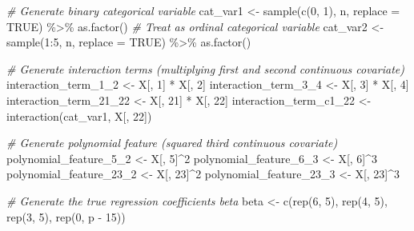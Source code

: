 \documentclass[
  11pt,
]{article}
\newenvironment{Shaded}{}{}
\newcommand{\AttributeTok}[1]{\textcolor[rgb]{0.49,0.56,0.16}{#1}}
\newcommand{\CommentTok}[1]{\textcolor[rgb]{0.38,0.63,0.69}{\textit{#1}}}
\newcommand{\ConstantTok}[1]{\textcolor[rgb]{0.53,0.00,0.00}{#1}}
\newcommand{\DecValTok}[1]{\textcolor[rgb]{0.25,0.63,0.44}{#1}}
\newcommand{\FunctionTok}[1]{\textcolor[rgb]{0.02,0.16,0.49}{#1}}
\newcommand{\NormalTok}[1]{#1}
\newcommand{\OtherTok}[1]{\textcolor[rgb]{0.00,0.44,0.13}{#1}}
\newcommand{\SpecialCharTok}[1]{\textcolor[rgb]{0.25,0.44,0.63}{#1}}
\begin{document}
\begin{Shaded}
\begin{Highlighting}[]
  \CommentTok{\# Generate binary categorical variable}
\NormalTok{  cat\_var1 }\OtherTok{\textless{}{-}} \FunctionTok{sample}\NormalTok{(}\FunctionTok{c}\NormalTok{(}\DecValTok{0}\NormalTok{, }\DecValTok{1}\NormalTok{), n, }\AttributeTok{replace =} \ConstantTok{TRUE}\NormalTok{) }\SpecialCharTok{\%\textgreater{}\%} 
    \FunctionTok{as.factor}\NormalTok{()}
  \CommentTok{\# Treat as ordinal categorical variable}
\NormalTok{  cat\_var2 }\OtherTok{\textless{}{-}} \FunctionTok{sample}\NormalTok{(}\DecValTok{1}\SpecialCharTok{:}\DecValTok{5}\NormalTok{, n, }\AttributeTok{replace =} \ConstantTok{TRUE}\NormalTok{) }\SpecialCharTok{\%\textgreater{}\%} 
    \FunctionTok{as.factor}\NormalTok{()}
  
  \CommentTok{\# Generate interaction terms (multiplying first and second continuous covariate)}
\NormalTok{  interaction\_term\_1\_2 }\OtherTok{\textless{}{-}}\NormalTok{ X[, }\DecValTok{1}\NormalTok{] }\SpecialCharTok{*}\NormalTok{ X[, }\DecValTok{2}\NormalTok{]}
\NormalTok{  interaction\_term\_3\_4 }\OtherTok{\textless{}{-}}\NormalTok{ X[, }\DecValTok{3}\NormalTok{] }\SpecialCharTok{*}\NormalTok{ X[, }\DecValTok{4}\NormalTok{]}
\NormalTok{  interaction\_term\_21\_22 }\OtherTok{\textless{}{-}}\NormalTok{ X[, }\DecValTok{21}\NormalTok{] }\SpecialCharTok{*}\NormalTok{ X[, }\DecValTok{22}\NormalTok{]}
\NormalTok{  interaction\_term\_c1\_22 }\OtherTok{\textless{}{-}} \FunctionTok{interaction}\NormalTok{(cat\_var1, X[, }\DecValTok{22}\NormalTok{])}
  
  \CommentTok{\# Generate polynomial feature (squared third continuous covariate)}
\NormalTok{  polynomial\_feature\_5\_2 }\OtherTok{\textless{}{-}}\NormalTok{ X[, }\DecValTok{5}\NormalTok{]}\SpecialCharTok{\^{}}\DecValTok{2}
\NormalTok{  polynomial\_feature\_6\_3 }\OtherTok{\textless{}{-}}\NormalTok{ X[, }\DecValTok{6}\NormalTok{]}\SpecialCharTok{\^{}}\DecValTok{3}
\NormalTok{  polynomial\_feature\_23\_2 }\OtherTok{\textless{}{-}}\NormalTok{ X[, }\DecValTok{23}\NormalTok{]}\SpecialCharTok{\^{}}\DecValTok{2}
\NormalTok{  polynomial\_feature\_23\_3 }\OtherTok{\textless{}{-}}\NormalTok{ X[, }\DecValTok{23}\NormalTok{]}\SpecialCharTok{\^{}}\DecValTok{3}
  
  \CommentTok{\# Generate the true regression coefficients beta}
\NormalTok{  beta }\OtherTok{\textless{}{-}} \FunctionTok{c}\NormalTok{(}\FunctionTok{rep}\NormalTok{(}\DecValTok{6}\NormalTok{, }\DecValTok{5}\NormalTok{), }\FunctionTok{rep}\NormalTok{(}\DecValTok{4}\NormalTok{, }\DecValTok{5}\NormalTok{), }\FunctionTok{rep}\NormalTok{(}\DecValTok{3}\NormalTok{, }\DecValTok{5}\NormalTok{), }\FunctionTok{rep}\NormalTok{(}\DecValTok{0}\NormalTok{, p }\SpecialCharTok{{-}} \DecValTok{15}\NormalTok{))}
  

\end{Highlighting}
\end{Shaded}
\end{document}
